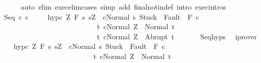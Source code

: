 \begin{isabellebody}
\ \ \ \ \isamarkupfalse%
\ {\isacharparenleft}auto\ elim{\isacharcolon}\ exec{\isacharunderscore}elim{\isacharunderscore}cases\ simp\ add{\isacharcolon}\ final{\isacharunderscore}notin{\isacharunderscore}def\ intro{\isacharcolon}\ exec{\isachardot}intros{\isacharparenright}\isanewline
\ \ \ \ \isamarkupfalse%
\isanewline
{}\isamarkupfalse%
\isanewline
\ \ \isamarkupfalse%
\ {\isacharparenleft}Seq\ c{}\ c{}{\isacharparenright}\ \isanewline
\ \ \isamarkupfalse%
\ hyp{\isacharunderscore}c{}{\isacharcolon}\ {\isachardoublequoteopen}{\isasymforall}Z{\isachardot}\ {\isasymGamma}{\isacharcomma}{\isasymTheta}{\isasymturnstile}\isactrlbsub {\isacharslash}F\isactrlesub \ {\isacharbraceleft}s{\isachardot}\ s{\isacharequal}Z\ {\isasymand}\ {\isasymGamma}{\isasymturnstile}{\isasymlangle}c{}{\isacharcomma}Normal\ s{\isasymrangle}\ {\isasymRightarrow}{\isasymnotin}{\isacharparenleft}{\isacharbraceleft}Stuck{\isacharbraceright}\ {\isasymunion}\ Fault\ {\isacharbackquote}\ {\isacharparenleft}{\isacharminus}F{\isacharparenright}{\isacharparenright}{\isacharbraceright}\ c{}\ \isanewline
\ \ \ \ \ \ \ \ \ \ \ \ \ \ \ \ \ \ \ \ \ \ \ \ \ \ \ {\isacharbraceleft}t{\isachardot}\ {\isasymGamma}{\isasymturnstile}{\isasymlangle}c{}{\isacharcomma}Normal\ Z{\isasymrangle}\ {\isasymRightarrow}\ Normal\ t{\isacharbraceright}{\isacharcomma}\isanewline
\ \ \ \ \ \ \ \ \ \ \ \ \ \ \ \ \ \ \ \ \ \ \ \ \ \ \ {\isacharbraceleft}t{\isachardot}\ {\isasymGamma}{\isasymturnstile}{\isasymlangle}c{}{\isacharcomma}Normal\ Z{\isasymrangle}\ {\isasymRightarrow}\ Abrupt\ t{\isacharbraceright}{\isachardoublequoteclose}\ \isanewline
\ \ \ \ \isamarkupfalse%
\ Seq{\isachardot}hyps\ \isamarkupfalse%
\ iprover\isanewline
\ \ \isamarkupfalse%
\ hyp{\isacharunderscore}c{}{\isacharcolon}\ {\isachardoublequoteopen}{\isasymforall}Z{\isachardot}\ {\isasymGamma}{\isacharcomma}{\isasymTheta}{\isasymturnstile}\isactrlbsub {\isacharslash}F\isactrlesub \ {\isacharbraceleft}s{\isachardot}\ s{\isacharequal}Z\ {\isasymand}\ {\isasymGamma}{\isasymturnstile}{\isasymlangle}c{}{\isacharcomma}Normal\ s{\isasymrangle}\ {\isasymRightarrow}{\isasymnotin}{\isacharparenleft}{\isacharbraceleft}Stuck{\isacharbraceright}\ {\isasymunion}\ Fault\ {\isacharbackquote}\ {\isacharparenleft}{\isacharminus}F{\isacharparenright}{\isacharparenright}{\isacharbraceright}\ c{}\ \isanewline
\ \ \ \ \ \ \ \ \ \ \ \ \ \ \ \ \ \ \ \ \ \ \ \ \ \ {\isacharbraceleft}t{\isachardot}\ {\isasymGamma}{\isasymturnstile}{\isasymlangle}c{}{\isacharcomma}Normal\ Z{\isasymrangle}\ {\isasymRightarrow}\ Normal\ t{\isacharbraceright}{\isacharcomma}\isanewline

\end{isabellebody}
